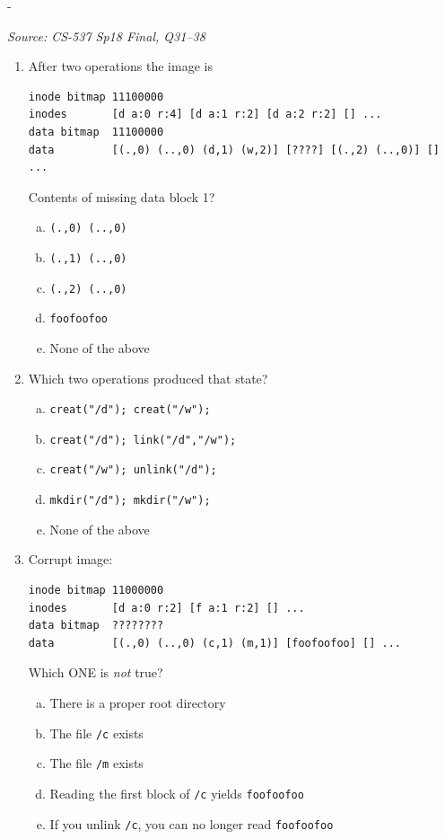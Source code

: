 \documentclass[11pt,a4paper]{article}
\makeatletter
\newcommand{\keepspace}[1]{\par\penalty-100\begingroup
  \setlength{\dimen@}{#1}\dimen@ii\pagegoal\advance\dimen@ii-\pagetotal
  \ifdim\dimen@>\dimen@ii\ifdim\dimen@ii>\z@\vfil\fi\break\fi\endgroup}
\newcounter{qn}[section]
\newenvironment{Qn}[4]{%
  \refstepcounter{qn}\keepspace{7\baselineskip}%
  \begin{tcolorbox}[qboxstyle, title={Q\thesection.\theqn\ \ [#1 \textbar\ #2]\ \ #4}]%
  {\footnotesize\color{g3}\textit{Source: #3}}\par\smallskip%
}{%
  \end{tcolorbox}%
}
\makeatother
\begin{document}
\begin{Qn}{Hard}{Lect 24}{CS-537 Sp18 Final, Q31--38}{Reconstruct a VSFS disk image}
\begin{enumerate}[(31)]
\begin{enumerate}[(a)]
      \item \texttt{[(.,0) (..,0) (/z,1)]}
      \item \texttt{[(.,0) (..,0) (/z,2)]}
      \end{enumerate}
\item After two operations the image is
\begin{lstlisting}[numbers=none]
inode bitmap 11100000
inodes       [d a:0 r:4] [d a:1 r:2] [d a:2 r:2] [] ...
data bitmap  11100000
data         [(.,0) (..,0) (d,1) (w,2)] [????] [(.,2) (..,0)] [] ...
\end{lstlisting}
      Contents of missing data block 1?
      \begin{enumerate}[(a)]
      \item \texttt{(.,0) (..,0)}
      \item \texttt{(.,1) (..,0)}
      \item \texttt{(.,2) (..,0)}
      \item \texttt{foofoofoo}
      \item None of the above
      \end{enumerate}
\item Which two operations produced that state?
      \begin{enumerate}[(a)]
      \item \texttt{creat("/d"); creat("/w");}
      \item \texttt{creat("/d"); link("/d","/w");}
      \item \texttt{creat("/w"); unlink("/d");}
      \item \texttt{mkdir("/d"); mkdir("/w");}
      \item None of the above
      \end{enumerate}
\item Corrupt image:
\begin{lstlisting}[numbers=none]
inode bitmap 11000000
inodes       [d a:0 r:2] [f a:1 r:2] [] ...
data bitmap  ????????
data         [(.,0) (..,0) (c,1) (m,1)] [foofoofoo] [] ...
\end{lstlisting}
      Which ONE is \emph{not} true?
      \begin{enumerate}[(a)]
      \item There is a proper root directory
      \item The file \texttt{/c} exists
      \item The file \texttt{/m} exists
      \item Reading the first block of \texttt{/c} yields \texttt{foofoofoo}
      \item If you unlink \texttt{/c}, you can no longer read \texttt{foofoofoo}

\end{enumerate}
\end{enumerate}
\end{Qn}
\end{document}
